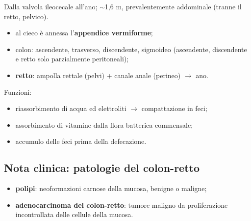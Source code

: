Dalla valvola ileocecale all'ano; $\sim$1,6 m, prevalentemente addominale (tranne il retto, pelvico).
\begin{itemize}
  \item al cieco è annessa l'\textbf{appendice vermiforme};
  \item colon: ascendente, trasverso, discendente, sigmoideo (ascendente, discendente e retto solo
    parzialmente peritoneali);
  \item \textbf{retto}: ampolla rettale (pelvi) + canale anale (perineo) $\rightarrow$ ano.
\end{itemize}
Funzioni:
\begin{itemize}
  \item riassorbimento di acqua ed elettroliti $\rightarrow$ compattazione in feci;
  \item assorbimento di vitamine dalla flora batterica commensale;
  \item accumulo delle feci prima della defecazione.
\end{itemize}

\subsection{Nota clinica: patologie del colon-retto}
\begin{itemize}
  \item \textbf{polipi}: neoformazioni carnose della mucosa, benigne o maligne;
  \item \textbf{adenocarcinoma del colon-retto}: tumore maligno da proliferazione incontrollata delle
    cellule della mucosa.
\end{itemize}
